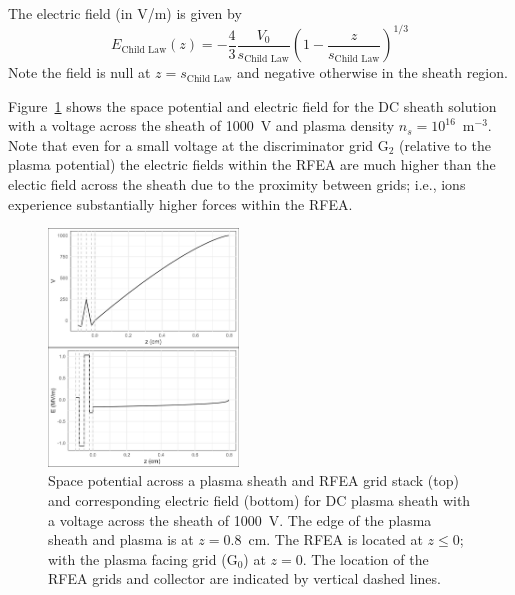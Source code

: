 The electric field (in V/m) is given by
\begin{equation}
E_\text{Child Law}(z) = -\frac{4}{3} \frac{V_0}{s_\text{Child Law}} \left( 1 - \frac{z}{s_\text{Child Law}}  \right)^{1/3}
\end{equation}
Note the field is null at $z=s_\text{Child Law}$ and negative otherwise in the sheath region. 

Figure~\ref{fig:DCpotentialField} shows the space potential and electric field for the DC sheath solution with a voltage across the sheath of 1000~V and plasma density $n_s = 10^{16}$~m$^{-3}$. Note that even for a small voltage at the discriminator grid G$_2$ (relative to the plasma potential) the electric fields within the RFEA are much higher than the electic field across the sheath due to the proximity between grids; i.e., ions experience substantially higher forces within the RFEA. 

\begin{figure}[htbp]
\centering
\includegraphics[width=0.45\textwidth]{Figures/VEz2DC1kVStack2332.jpeg}
\caption{Space potential across a plasma sheath and RFEA grid stack (top) and corresponding electric field (bottom) for DC plasma sheath with a voltage across the sheath of 1000~V. The edge of the plasma sheath and plasma is at $z=0.8$~cm. The RFEA is located at $z\le0$; with the plasma facing grid (G$_0$) at $z=0$. The location of the RFEA grids and collector are indicated by vertical dashed lines.}
\label{fig:DCpotentialField}
\end{figure}



